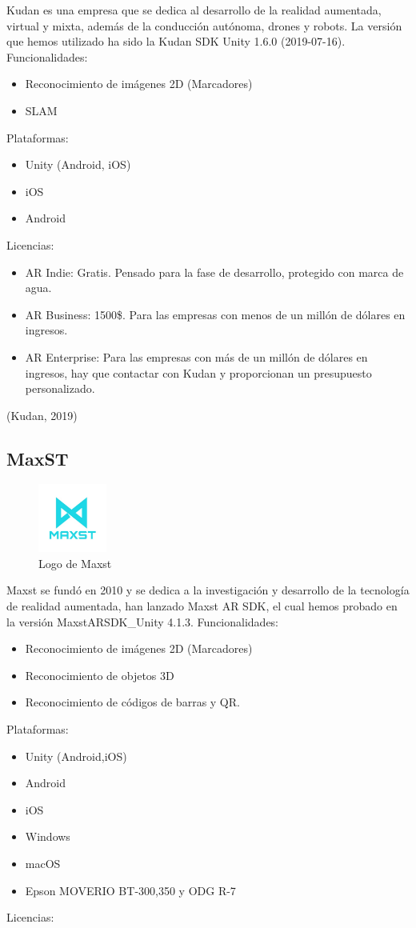 Kudan es una empresa que se dedica al desarrollo de la realidad aumentada, virtual y mixta, además de la conducción autónoma, drones y robots. La versión que hemos utilizado ha sido la Kudan SDK Unity 1.6.0 (2019-07-16).
Funcionalidades:
\begin{itemize}
\item Reconocimiento de imágenes 2D (Marcadores)
\item SLAM
\end{itemize}
Plataformas:
\begin{itemize}
\item Unity (Android, iOS)
\item iOS
\item Android
\end{itemize}
Licencias:
\begin{itemize}
\item AR Indie: Gratis. Pensado para la fase de desarrollo, protegido con marca de agua.
\item AR Business: 1500\$. Para las empresas con menos de un millón de dólares en ingresos.
\item AR Enterprise: Para las empresas con más de un millón de dólares en ingresos, hay que contactar con Kudan y proporcionan un presupuesto personalizado.
\end{itemize}
(Kudan, 2019)

\subsection{MaxST}

 \begin{figure}[H]
    \centering
    \includegraphics[width=0.2\textwidth]{Images/Maxst_Logo.jpeg}
    \caption{Logo de Maxst}
    \label{fig:Maxst}
\end{figure}

Maxst se fundó en 2010 y se dedica a la investigación y desarrollo de la tecnología de realidad aumentada, han lanzado Maxst AR SDK, el cual hemos probado en la versión MaxstARSDK\_Unity 4.1.3.
Funcionalidades:
\begin{itemize}
\item Reconocimiento de imágenes 2D (Marcadores)
\item Reconocimiento de objetos 3D
\item Reconocimiento de códigos de barras y QR.
\end{itemize}
Plataformas:
\begin{itemize}
\item Unity (Android,iOS)
\item Android
\item iOS
\item Windows
\item macOS
\item Epson MOVERIO BT-300,350 y ODG R-7
\end{itemize}
Licencias:


